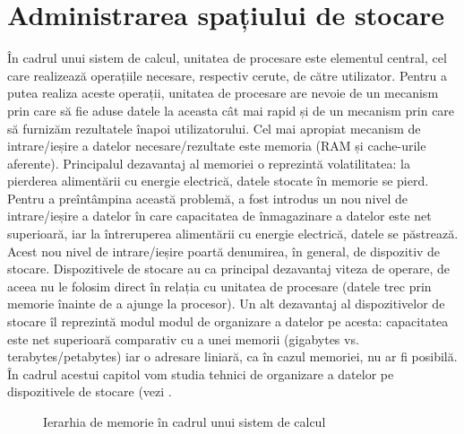 \chapter{Administrarea spațiului de stocare}
\label{chapter:storage}

În cadrul unui sistem de calcul, unitatea de procesare este elementul central,
cel care realizează operațiile necesare, respectiv cerute, de către utilizator.
Pentru a putea realiza aceste operații, unitatea de procesare are nevoie de un
mecanism prin care să fie aduse datele la aceasta cât mai rapid și de un
mecanism prin care să furnizăm rezultatele înapoi utilizatorului. Cel mai
apropiat mecanism de intrare/ieșire a datelor necesare/rezultate este memoria
(RAM și cache-urile aferente). Principalul dezavantaj al memoriei o reprezintă
volatilitatea: la pierderea alimentării cu energie electrică, datele stocate în
memorie se pierd. Pentru a preîntâmpina această problemă, a fost introdus un nou
nivel de intrare/ieșire a datelor în care capacitatea de înmagazinare a datelor
este net superioară, iar la întreruperea alimentării cu energie electrică,
datele se păstrează. Acest nou nivel de intrare/ieșire poartă denumirea, în
general, de dispozitiv de stocare. Dispozitivele de stocare au ca principal
dezavantaj viteza de operare, de aceea nu le folosim direct în relația cu
unitatea de procesare (datele trec prin memorie înainte de a ajunge la
procesor). Un alt dezavantaj al dispozitivelor de stocare îl reprezintă modul
modul de organizare a datelor pe acesta: capacitatea este net superioară
comparativ cu a unei memorii (gigabytes vs. terabytes/petabytes) iar o adresare
liniară, ca în cazul memoriei, nu ar fi posibilă. În cadrul acestui capitol vom
studia tehnici de organizare a datelor pe dispozitivele de stocare (vezi
.

\begin{figure}[htbp]
	\centering
	\def\svgwidth{\columnwidth}
	
	\caption{Ierarhia de memorie în cadrul unui sistem de calcul}
	\label{fig:storage-mem-struct}
\end{figure}

